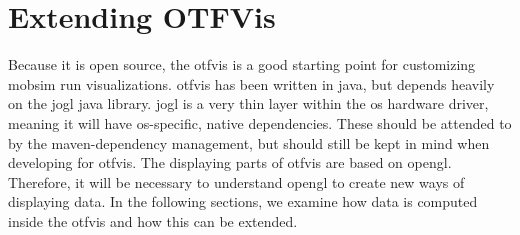\section{Extending OTFVis}
Because it is open source, the \gls{otfvis} is a good starting point for customizing mobsim run visualizations. 
\gls{otfvis} has been written in \gls{java}, but depends heavily on the \gls{jogl} \gls{java} library.%
\gls{jogl} is a very thin layer within the \gls{os} hardware driver, meaning it will have \gls{os}-specific, native dependencies. 
These should be attended to by the maven-dependency management, but should still be kept in mind when developing for \gls{otfvis}. 
The displaying parts of \gls{otfvis} are based on \gls{opengl}. 
Therefore, it will be necessary to understand \gls{opengl} to create new ways of displaying data. 
In the following sections, we examine how data is computed inside the \gls{otfvis} and how this can be extended.

